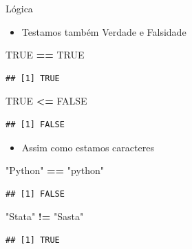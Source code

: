 \documentclass[
  10pt,
  ignorenonframetext,
]{beamer}
\newenvironment{Shaded}{\begin{snugshade}}{\end{snugshade}}
\newcommand{\OperatorTok}[1]{\textcolor[rgb]{0.81,0.36,0.00}{\textbf{#1}}}
\newcommand{\OtherTok}[1]{\textcolor[rgb]{0.56,0.35,0.01}{#1}}
\newcommand{\StringTok}[1]{\textcolor[rgb]{0.31,0.60,0.02}{#1}}
\providecommand{\tightlist}{%
  \setlength{\itemsep}{0pt}\setlength{\parskip}{0pt}}
\begin{document}
\begin{frame}[fragile]{Lógica}
\protect\hypertarget{luxf3gica-1}{}
\begin{itemize}
\tightlist
\item
  Testamos também Verdade e Falsidade
\end{itemize}

\begin{Shaded}
\begin{Highlighting}[]
\OtherTok{TRUE} \OperatorTok{==}\StringTok{ }\OtherTok{TRUE}
\end{Highlighting}
\end{Shaded}

\begin{verbatim}
## [1] TRUE
\end{verbatim}

\begin{Shaded}
\begin{Highlighting}[]
\OtherTok{TRUE} \OperatorTok{\textless{}=}\StringTok{ }\OtherTok{FALSE}
\end{Highlighting}
\end{Shaded}

\begin{verbatim}
## [1] FALSE
\end{verbatim}

\begin{itemize}
\tightlist
\item
  Assim como estamos caracteres
\end{itemize}

\begin{Shaded}
\begin{Highlighting}[]
\StringTok{"Python"} \OperatorTok{==}\StringTok{ "python"}
\end{Highlighting}
\end{Shaded}

\begin{verbatim}
## [1] FALSE
\end{verbatim}

\begin{Shaded}
\begin{Highlighting}[]
\StringTok{"Stata"} \OperatorTok{!=}\StringTok{ "Sasta"}
\end{Highlighting}
\end{Shaded}

\begin{verbatim}
## [1] TRUE
\end{verbatim}
\end{frame}
\end{document}
